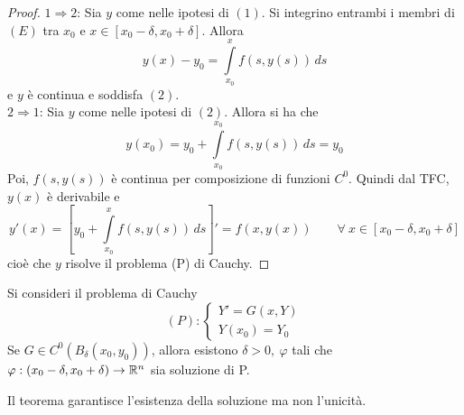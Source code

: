 \begin{proof}
    $1 \Rightarrow 2$: Sia $y$ come nelle ipotesi di $(1)$. Si integrino entrambi i membri di $(E)$ tra $x_0$ e $x \in [x_0-\delta, x_0+\delta]$. Allora
    \begin{equation}
        y(x)-y_0=\int\limits_{x_0}^{x}{f(s, y(s))}\,ds
    \end{equation}
    e $y$ è continua e soddisfa $(2)$.\\
    $2 \Rightarrow 1$: Sia $y$ come nelle ipotesi di $(2)$. Allora si ha che
    \begin{equation}
        y(x_0)= y_0 + \int\limits_{x_0}^{x_0}{f(s, y(s))}\, ds= y_0
    \end{equation}
    Poi, $f(s, y(s))$ è continua per composizione di funzioni $C^0$. Quindi dal TFC, $y(x)$ è derivabile e
    \begin{equation}
        y'(x)= \left[y_0 + \int\limits_{x_0}^{x}{f(s, y(s))}\, ds\right]'= f(x, y(x)) \qquad \forall\ x \in [x_0-\delta, x_0+\delta]
    \end{equation}
    cioè che $y$ risolve il problema (P) di Cauchy.
\end{proof}
\begin{theorem}
Si consideri il problema di Cauchy
\begin{equation}
    (P): \begin{cases}
        Y'=G(x, Y)\\
        Y(x_0)=Y_0
    \end{cases}
\end{equation}
Se $G \in C^0(B_\delta(x_0, y_0))$, allora esistono $\delta>0,\ \varphi$ tali che $\varphi: (x_0- \delta, x_0+\delta) \to \mathbb{R}^n$ sia soluzione di P.
\end{theorem}
Il teorema garantisce l'esistenza della soluzione ma non l'unicità.
